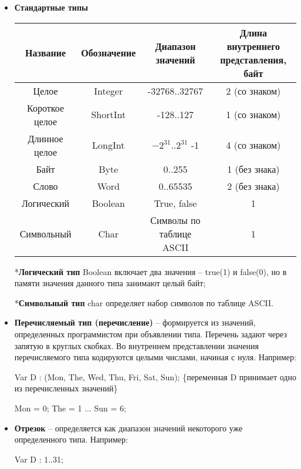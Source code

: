 \begin{itemize}

\item {\bf{Стандартные типы}}

\begin{center}
\begin{tabular}{ | c | c | c | c | }
\hline
Название & Обозначение & Диапазон значений & Длина внутреннего представления, байт\\
\hline
Целое & Integer & -32768..32767 & 2 (со знаком) \\
\hline
Короткое целое & ShortInt & -128..127 & 1 (со знаком) \\
\hline
Длинное целое & LongInt & $-2^{31}$..$2^{31}$ -1 & 4 (со знаком) \\
\hline
Байт & Byte & 0..255 & 1 (без знака) \\
\hline
Слово & Word & 0..65535 & 2 (без знака) \\
\hline
Логический & Boolean & True, false & 1 \\ 
\hline
Символьный & Char & Символы по таблице ASCII & 1\\
\hline
\end{tabular}
\end{center}

*{\bf{Логический тип}} Boolean включает два значения – true(1) и false(0), но в памяти значения данного типа занимают целый байт;

*{\bf{Символьный тип}} char определяет набор символов по таблице ASCII. 

\item {\bf{Перечисляемый тип (перечисление)}} 
– формируется из значений, определенных программистом при объявлении типа. Перечень задают через запятую в круглых скобках. Во внутреннем представлении значения перечисляемого типа кодируются целыми числами, начиная с нуля. Например:


Var D : (Mon, The, Wed, Thu, Fri, Sat, Sun);   \{переменная D принимает одно из перечисленных значений\}

Mon = 0; The = 1 ... Sun = 6;

\item {\bf{Отрезок}}
– определяется как диапазон значений некоторого уже определенного типа. Например: 

Var D : 1..31;


\end{itemize}
